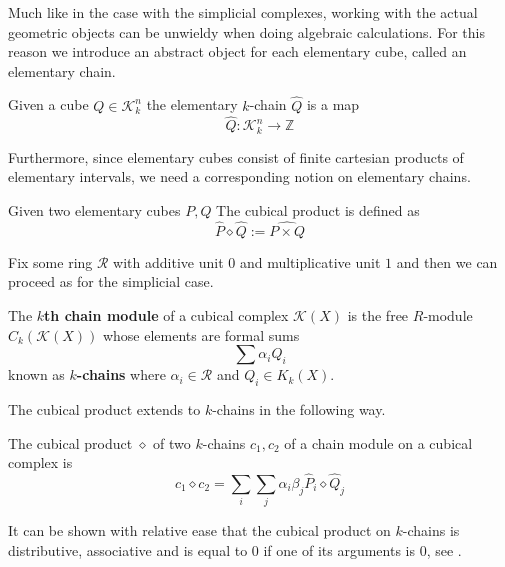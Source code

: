 \begin{example}
Much like in the case with the simplicial complexes, working with the actual geometric objects can be unwieldy when doing algebraic calculations. For this reason we introduce an abstract object for each elementary cube, called an elementary chain.
\begin{definition}
  Given a cube $Q \in \mathcal{K}^{n}_{k}$ the elementary $k$-chain $\hat Q$ is a map
  \[\hat Q: \mathcal{K}^{n}_{k} \to \mathbb{Z}\]
\end{definition}

Furthermore, since elementary cubes consist of finite cartesian products of elementary intervals, we need a corresponding notion on elementary chains.

\begin{definition}
Given two elementary cubes $P,Q$ The cubical product is defined as \[\hat P \diamond \hat Q:= \widehat{P \times Q}\]
\end{definition}
Fix some ring $\mathcal{R}$ with additive unit $0$ and multiplicative unit $1$ and then we can proceed as for the simplicial case.
\begin{definition}[{\cite[Definition 2.27, p. ~53]
  The \textbf{$k$th chain module} of a cubical complex $\mathcal{K}(X)$ is the free $R$-module $C_{k}(\mathcal{K}(X))$ whose elements are formal sums
  \[ \sum \alpha_{i} Q_{i}\]
  known as \textbf{$k$-chains} where $\alpha_{i} \in \mathcal{R}$ and $Q_{i} \in K_{k}(X)$.
\end{definition}

The cubical product extends to $k$-chains in the following way.

\begin{definition}
The cubical product $\diamond$ of two $k$-chains $c_{1},c_{2}$ of a chain module on a cubical complex is \[ c_{1} \diamond c_{2} = \sum_{i} \sum_{j} \alpha_{i} \beta_{j} \hat P_{i} \diamond  \hat Q_{j}\]
\end{definition}

It can be shown with relative ease that the cubical product on $k$-chains is distributive, associative and is equal to 0 if one of its arguments is 0, see \cite[Proposition 2.25, p. ~51]{kaczynski2004}.


\end{example}
